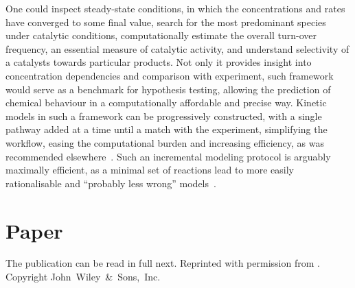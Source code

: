 One could inspect steady-state conditions, in which the concentrations and rates have converged to some final value,
search for the most predominant species under catalytic conditions, computationally estimate the overall turn-over frequency,
an essential measure of catalytic activity, and understand selectivity of a catalysts towards particular products.
Not only it provides insight into concentration dependencies and comparison with experiment,
such framework would serve as a benchmark for hypothesis testing, allowing the prediction of chemical behaviour in a computationally affordable and precise way.
Kinetic models in such a framework can be progressively constructed, with a single pathway added at a time until a match with the experiment,
simplifying the workflow, easing the computational burden and increasing efficiency, as was recommended elsewhere~\cite{Jara_z_2019}.
Such an incremental modeling protocol is arguably maximally efficient, as a
minimal set of reactions lead to more easily rationalisable and
``probably less wrong'' models~\cite{Blackmond_2015,Jara_z_2019}.

\section{Paper}

The publication can be read in full next.
Reprinted with permission from
.
Copyright
\citeyear{Schneider2022}
John~Wiley~\&~Sons,~Inc.


